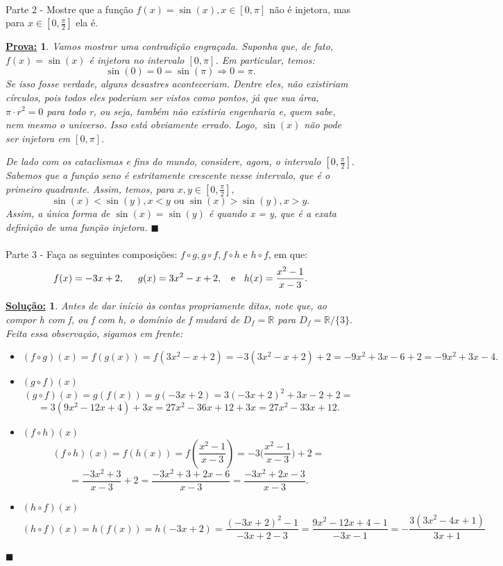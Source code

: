 \documentclass{article}
\newtheorem*{sol*}{\underline{Solu\c c\~ao:}}
\newtheorem*{proof*}{\underline{Prova:}}
\renewcommand\qedsymbol{$\blacksquare$}
\begin{document}
\paragraph{}Parte 2 - Mostre que a fun\c c\~ao $f(x) = \sin(x), x\in[0, \pi]$ n\~ao \'e injetora, mas para $x\in[0, \frac{\pi}{2}]$ ela \'e.
\begin{proof*}
Vamos mostrar uma contradi\c c\~ao engra\c cada. Suponha que, de fato, $f(x) = \sin(x)$ \'e injetora no intervalo $[0, \pi]$. Em particular, temos:
$$
\sin(0) = 0 = \sin(\pi) \Rightarrow 0 = \pi.
$$
Se isso fosse verdade, alguns desastres aconteceriam. Dentre eles, n\~ao existiriam c\'irculos, pois todos eles poderiam ser vistos como pontos, j\'a que sua \'area, $\pi\cdot{r^2} = 0$ para todo r, ou seja, tamb\'em n\~ao existiria engenharia e, quem sabe, nem mesmo o universo. Isso est\'a obviamente errado. Logo, $\sin(x)$ n\~ao pode ser injetora em $[0, \pi].$ 

De lado com os cataclismas e fins do mundo, considere, agora, o intervalo $[0, \frac{\pi}{2}].$ Sabemos que a fun\c c\~ao seno \'e estritamente crescente nesse intervalo, que \'e o primeiro quadrante. Assim, temos, para $x, y\in[0, \frac{\pi}{2}],$
$$
\sin(x) < \sin(y), x < y \text{ ou } \sin(x) > \sin(y), x > y.
$$
Assim, a \'unica forma de $\sin(x) = \sin(y)$ \'e quando x = y, que \'e a exata defini\c c\~ao de uma fun\c c\~ao injetora.
\qedsymbol
\end{proof*}

\paragraph{}Parte 3 - Fa\c ca as seguintes composi\c c\~oes: $f\circ{g}, g\circ{f}, f\circ{h} \text{ e } h\circ{f}$, em que:
$$
f(x) = -3x + 2, \hspace{0.5cm} g(x) = 3x^2 - x  + 2, \hspace{0.2cm} \text{ e } \hspace{0.2cm} h(x) = \frac{x^2 - 1}{x - 3}.
$$
\begin{sol*}
Antes de dar in\'icio \`as contas propriamente ditas, note que, ao compor h com f, ou f com h, o dom\'inio de f mudar\'a de $D_f = \mathbb{R}$ para $D_f = \mathbb{R}/\{3\}.$ Feita essa observa\c c\~ao, sigamos em frente:
\begin{itemize}
\item[i)]$$(f\circ{g})(x) = f(g(x)) = f(3x^2 - x + 2) = -3(3x^2 - x + 2) + 2 = -9x^2 + 3x - 6 + 2 = -9x^2 + 3x - 4.$$
\item[ii)]$(g\circ{f})(x)$
$$
(g\circ{f})(x) = g(f(x)) = g(-3x + 2) = 3(-3x + 2)^2 +3x - 2 + 2 =
$$
$$
= 3(9x^2 - 12x + 4) + 3x = 27x^2 - 36x + 12 + 3x = 27x^2 - 33x + 12.
$$
\item[iii)]$(f\circ{h})(x)$
$$
(f\circ{h})(x) = f(h(x)) = f(\frac{x^2 - 1}{x - 3}) = -3\biggl(\frac{x^2 - 1}{x - 3}\biggr) + 2 = 
$$
$$
= \frac{-3x^2 + 3}{x-3} + 2 = \frac{-3x^2 + 3 + 2x - 6}{x-3} = \frac{-3x^2 + 2x -3}{x-3}.
$$
\item[iv)]$(h\circ{f})(x) $
$$
(h\circ{f})(x) = h(f(x)) = h(-3x + 2) = \frac{(-3x + 2)^2 - 1}{-3x+2 - 3} = \frac{9x^2 -12x + 4 - 1}{-3x -1} = -\frac{3(3x^2 - 4x + 1)}{3x+1}
$$
\end{itemize} 
\qedsymbol
\end{sol*}
\end{document}
